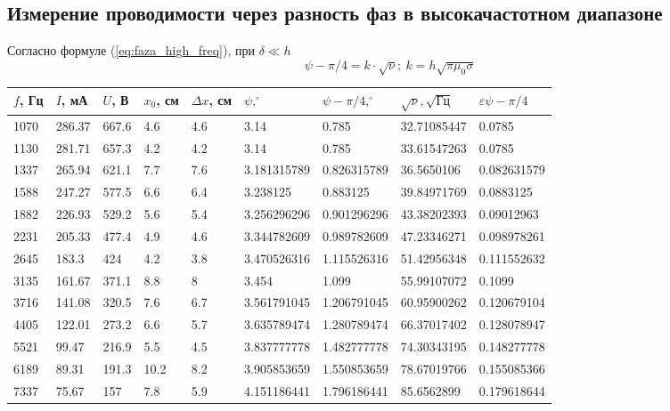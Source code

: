 \documentclass[a4paper, 12pt]{article}
\begin{document}
	\subsection{Измерение проводимости через разность фаз в высокачастотном диапазоне}
Согласно формуле (\ref{eq:faza_high_freq}), при $\delta \ll h$
\begin{equation*}
    \psi - \pi/4 = k\cdot \sqrt{\nu}; \ k = h\sqrt{\pi\mu_0\sigma}
\end{equation*}
\newpage
\begin{table}[!ht]
    \centering
    \begin{tabular}{|l|l|l|l|l|l|l|l|l|}
    \hline
        $f$, Гц & $I$, мА & $U$, В & $x_0$, см & $\Delta x$, см& $\psi, ^{\circ}$  & $\psi-\pi/4, ^{\circ}$ & $\sqrt{\nu}, \sqrt{\text{Гц}}$ & $\varepsilon{\psi-\pi/4}$ \\ \hline
        1070 & 286.37 & 667.6 & 4.6 & 4.6 & 3.14 & 0.785 & 32.71085447 & 0.0785 \\ \hline
        1130 & 281.71 & 657.3 & 4.2 & 4.2 & 3.14 & 0.785 & 33.61547263 & 0.0785 \\ \hline
        1337 & 265.94 & 621.1 & 7.7 & 7.6 & 3.181315789 & 0.826315789 & 36.5650106 & 0.082631579 \\ \hline
        1588 & 247.27 & 577.5 & 6.6 & 6.4 & 3.238125 & 0.883125 & 39.84971769 & 0.0883125 \\ \hline
        1882 & 226.93 & 529.2 & 5.6 & 5.4 & 3.256296296 & 0.901296296 & 43.38202393 & 0.09012963 \\ \hline
        2231 & 205.33 & 477.4 & 4.9 & 4.6 & 3.344782609 & 0.989782609 & 47.23346271 & 0.098978261 \\ \hline
        2645 & 183.3 & 424 & 4.2 & 3.8 & 3.470526316 & 1.115526316 & 51.42956348 & 0.111552632 \\ \hline
        3135 & 161.67 & 371.1 & 8.8 & 8 & 3.454 & 1.099 & 55.99107072 & 0.1099 \\ \hline
        3716 & 141.08 & 320.5 & 7.6 & 6.7 & 3.561791045 & 1.206791045 & 60.95900262 & 0.120679104 \\ \hline
        4405 & 122.01 & 273.2 & 6.6 & 5.7 & 3.635789474 & 1.280789474 & 66.37017402 & 0.128078947 \\ \hline
        5521 & 99.47 & 216.9 & 5.5 & 4.5 & 3.837777778 & 1.482777778 & 74.30343195 & 0.148277778 \\ \hline
        6189 & 89.31 & 191.3 & 10.2 & 8.2 & 3.905853659 & 1.550853659 & 78.67019766 & 0.155085366 \\ \hline
        7337 & 75.67 & 157 & 7.8 & 5.9 & 4.151186441 & 1.796186441 & 85.6562899 & 0.179618644 \\ \hline

\end{tabular}
\end{table}
\end{document}
